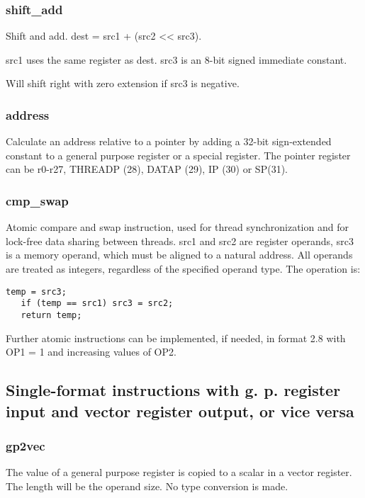 \documentclass[forwardcom.tex]{subfiles}
\begin{document}
\subsubsection{shift\_add}
Shift and add. dest = src1 + (src2 \textless\textless{}  src3).
\vspace{2mm}

src1 uses the same register as dest. src3 is an 8-bit signed immediate constant.
\vspace{2mm}

Will shift right with zero extension if src3 is negative.

\subsubsection{address}
Calculate an address relative to a pointer by adding a 32-bit sign-extended constant to a general purpose register or a special register. The pointer register can be r0-r27, THREADP (28), DATAP (29), IP (30) or SP(31).

\subsubsection{cmp\_swap}
Atomic compare and swap instruction, used for thread synchronization and for lock-free data sharing between threads. src1 and src2 are register operands, src3 is a memory operand, which must be aligned to a natural address. All operands are treated as integers, regardless of the specified operand type. The operation is:

\begin{lstlisting}[frame=none]
   temp = src3;
   if (temp == src1) src3 = src2;
   return temp;
\end{lstlisting}

Further atomic instructions can be implemented, if needed, in format 2.8 with OP1 = 1 and increasing values of OP2.

\subsection{Single-format instructions with g. p. register input and vector register output, or vice versa}

\subsubsection{gp2vec}
The value of a general purpose register is copied to a scalar in a vector register. The length will be the operand size. No type conversion is made.
\end{document}
